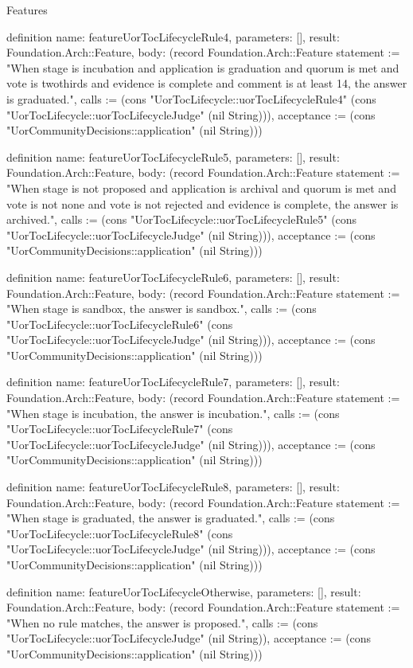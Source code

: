 \begin{lexlean}{Features}
\begin{semanticmodule}
definition{
  name: featureUorTocLifecycleRule4,
  parameters: [],
  result: Foundation.Arch::Feature,
  body: (record Foundation.Arch::Feature {statement := "When stage is incubation and application is graduation and quorum is met and vote is twothirds and evidence is complete and comment is at least 14, the answer is graduated.", calls := (cons "UorTocLifecycle::uorTocLifecycleRule4" (cons "UorTocLifecycle::uorTocLifecycleJudge" (nil String))), acceptance := (cons "UorCommunityDecisions::application" (nil String))})
}

definition{
  name: featureUorTocLifecycleRule5,
  parameters: [],
  result: Foundation.Arch::Feature,
  body: (record Foundation.Arch::Feature {statement := "When stage is not proposed and application is archival and quorum is met and vote is not none and vote is not rejected and evidence is complete, the answer is archived.", calls := (cons "UorTocLifecycle::uorTocLifecycleRule5" (cons "UorTocLifecycle::uorTocLifecycleJudge" (nil String))), acceptance := (cons "UorCommunityDecisions::application" (nil String))})
}

definition{
  name: featureUorTocLifecycleRule6,
  parameters: [],
  result: Foundation.Arch::Feature,
  body: (record Foundation.Arch::Feature {statement := "When stage is sandbox, the answer is sandbox.", calls := (cons "UorTocLifecycle::uorTocLifecycleRule6" (cons "UorTocLifecycle::uorTocLifecycleJudge" (nil String))), acceptance := (cons "UorCommunityDecisions::application" (nil String))})
}

definition{
  name: featureUorTocLifecycleRule7,
  parameters: [],
  result: Foundation.Arch::Feature,
  body: (record Foundation.Arch::Feature {statement := "When stage is incubation, the answer is incubation.", calls := (cons "UorTocLifecycle::uorTocLifecycleRule7" (cons "UorTocLifecycle::uorTocLifecycleJudge" (nil String))), acceptance := (cons "UorCommunityDecisions::application" (nil String))})
}

definition{
  name: featureUorTocLifecycleRule8,
  parameters: [],
  result: Foundation.Arch::Feature,
  body: (record Foundation.Arch::Feature {statement := "When stage is graduated, the answer is graduated.", calls := (cons "UorTocLifecycle::uorTocLifecycleRule8" (cons "UorTocLifecycle::uorTocLifecycleJudge" (nil String))), acceptance := (cons "UorCommunityDecisions::application" (nil String))})
}

definition{
  name: featureUorTocLifecycleOtherwise,
  parameters: [],
  result: Foundation.Arch::Feature,
  body: (record Foundation.Arch::Feature {statement := "When no rule matches, the answer is proposed.", calls := (cons "UorTocLifecycle::uorTocLifecycleJudge" (nil String)), acceptance := (cons "UorCommunityDecisions::application" (nil String))})
}


\end{semanticmodule}
\end{lexlean}
